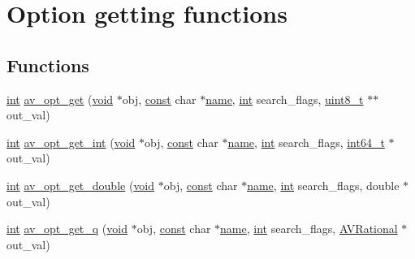 \hypertarget{group__opt__get__funcs}{}\section{Option getting functions}
\label{group__opt__get__funcs}
\subsection*{Functions}
\begin{DoxyCompactItemize}
\item 
\hyperlink{xmltok_8h_a5a0d4a5641ce434f1d23533f2b2e6653}{int} \hyperlink{group__opt__get__funcs_gaf31144e60f9ce89dbe8cbea57a0b232c}{av\+\_\+opt\+\_\+get} (\hyperlink{sound_8c_ae35f5844602719cf66324f4de2a658b3}{void} $\ast$obj, \hyperlink{getopt1_8c_a2c212835823e3c54a8ab6d95c652660e}{const} char $\ast$\hyperlink{lib_2expat_8h_a1b49b495b59f9e73205b69ad1a2965b0}{name}, \hyperlink{xmltok_8h_a5a0d4a5641ce434f1d23533f2b2e6653}{int} search\+\_\+flags, \hyperlink{lib-src_2ffmpeg_2win32_2stdint_8h_a9a941819355e6f658991890ff66b4b0e}{uint8\+\_\+t} $\ast$$\ast$out\+\_\+val)
\item 
\hyperlink{xmltok_8h_a5a0d4a5641ce434f1d23533f2b2e6653}{int} \hyperlink{group__opt__get__funcs_gaab5b9c0969efe56420536a5d190e59bd}{av\+\_\+opt\+\_\+get\+\_\+int} (\hyperlink{sound_8c_ae35f5844602719cf66324f4de2a658b3}{void} $\ast$obj, \hyperlink{getopt1_8c_a2c212835823e3c54a8ab6d95c652660e}{const} char $\ast$\hyperlink{lib_2expat_8h_a1b49b495b59f9e73205b69ad1a2965b0}{name}, \hyperlink{xmltok_8h_a5a0d4a5641ce434f1d23533f2b2e6653}{int} search\+\_\+flags, \hyperlink{lib-src_2ffmpeg_2win32_2stdint_8h_a67a9885ef4908cb72ce26d75b694386c}{int64\+\_\+t} $\ast$out\+\_\+val)
\item 
\hyperlink{xmltok_8h_a5a0d4a5641ce434f1d23533f2b2e6653}{int} \hyperlink{group__opt__get__funcs_ga4ee50245cd18a65ec1cd27bc8e0cab83}{av\+\_\+opt\+\_\+get\+\_\+double} (\hyperlink{sound_8c_ae35f5844602719cf66324f4de2a658b3}{void} $\ast$obj, \hyperlink{getopt1_8c_a2c212835823e3c54a8ab6d95c652660e}{const} char $\ast$\hyperlink{lib_2expat_8h_a1b49b495b59f9e73205b69ad1a2965b0}{name}, \hyperlink{xmltok_8h_a5a0d4a5641ce434f1d23533f2b2e6653}{int} search\+\_\+flags, double $\ast$out\+\_\+val)
\item 
\hyperlink{xmltok_8h_a5a0d4a5641ce434f1d23533f2b2e6653}{int} \hyperlink{group__opt__get__funcs_gabc553a1b95468f935eedfa9db86e2a15}{av\+\_\+opt\+\_\+get\+\_\+q} (\hyperlink{sound_8c_ae35f5844602719cf66324f4de2a658b3}{void} $\ast$obj, \hyperlink{getopt1_8c_a2c212835823e3c54a8ab6d95c652660e}{const} char $\ast$\hyperlink{lib_2expat_8h_a1b49b495b59f9e73205b69ad1a2965b0}{name}, \hyperlink{xmltok_8h_a5a0d4a5641ce434f1d23533f2b2e6653}{int} search\+\_\+flags, \hyperlink{struct_a_v_rational}{A\+V\+Rational} $\ast$out\+\_\+val)
$$
\end{DoxyCompactItemize}
